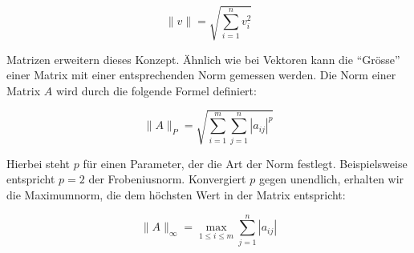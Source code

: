 \begin{equation}
    \| v \| = \sqrt{\sum_{i=1}^{n} v_i^2}
    \label{eq:Vektornorm}
\end{equation}

Matrizen erweitern dieses Konzept. Ähnlich wie bei Vektoren kann die "`Grösse"' einer Matrix mit einer entsprechenden Norm gemessen werden. Die Norm einer Matrix $A$ wird durch die folgende Formel definiert:

\begin{equation}
    \| A \|_P = \sqrt{\sum_{i=1}^{m} \sum_{j=1}^{n} |a_{ij}|^p}
    \label{eq:Matrixnorm}
\end{equation}

Hierbei steht $p$ für einen Parameter, der die Art der Norm festlegt. Beispielsweise entspricht $p = 2$ der Frobeniusnorm. Konvergiert $p$ gegen unendlich, erhalten wir die Maximumnorm, die dem höchsten Wert in der Matrix entspricht:

\begin{equation}
    \|A\|_{\infty} = \max_{1 \leq i \leq m} \sum_{j=1}^{n} |a_{ij}|
    \label{eq:Maximumnorm}
\end{equation}